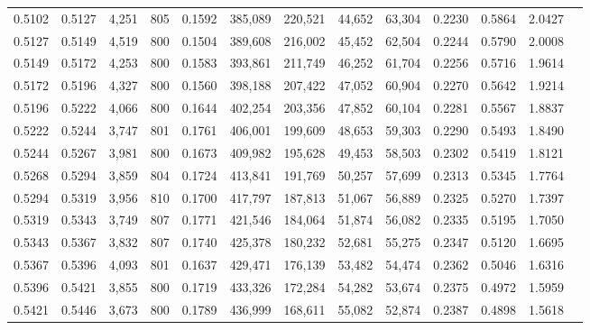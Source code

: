 \begin{tabular}{rrrrrrrrrrrrr}
0.5102 & 0.5127 &  4,251 & 805 &                                     0.1592 & 385,089 & 220,521 &  44,652 &  63,304 & 0.2230 & 0.5864 & 2.0427 \\
0.5127 & 0.5149 &  4,519 & 800 &                                     0.1504 & 389,608 & 216,002 &  45,452 &  62,504 & 0.2244 & 0.5790 & 2.0008 \\
0.5149 & 0.5172 &  4,253 & 800 &                                     0.1583 & 393,861 & 211,749 &  46,252 &  61,704 & 0.2256 & 0.5716 & 1.9614 \\
0.5172 & 0.5196 &  4,327 & 800 &                                     0.1560 & 398,188 & 207,422 &  47,052 &  60,904 & 0.2270 & 0.5642 & 1.9214 \\
0.5196 & 0.5222 &  4,066 & 800 &                                     0.1644 & 402,254 & 203,356 &  47,852 &  60,104 & 0.2281 & 0.5567 & 1.8837 \\
0.5222 & 0.5244 &  3,747 & 801 &                                     0.1761 & 406,001 & 199,609 &  48,653 &  59,303 & 0.2290 & 0.5493 & 1.8490 \\
0.5244 & 0.5267 &  3,981 & 800 &                                     0.1673 & 409,982 & 195,628 &  49,453 &  58,503 & 0.2302 & 0.5419 & 1.8121 \\
0.5268 & 0.5294 &  3,859 & 804 &                                     0.1724 & 413,841 & 191,769 &  50,257 &  57,699 & 0.2313 & 0.5345 & 1.7764 \\
0.5294 & 0.5319 &  3,956 & 810 &                                     0.1700 & 417,797 & 187,813 &  51,067 &  56,889 & 0.2325 & 0.5270 & 1.7397 \\
0.5319 & 0.5343 &  3,749 & 807 &                                     0.1771 & 421,546 & 184,064 &  51,874 &  56,082 & 0.2335 & 0.5195 & 1.7050 \\
0.5343 & 0.5367 &  3,832 & 807 &                                     0.1740 & 425,378 & 180,232 &  52,681 &  55,275 & 0.2347 & 0.5120 & 1.6695 \\
0.5367 & 0.5396 &  4,093 & 801 &                                     0.1637 & 429,471 & 176,139 &  53,482 &  54,474 & 0.2362 & 0.5046 & 1.6316 \\
0.5396 & 0.5421 &  3,855 & 800 &                                     0.1719 & 433,326 & 172,284 &  54,282 &  53,674 & 0.2375 & 0.4972 & 1.5959 \\
0.5421 & 0.5446 &  3,673 & 800 &                                     0.1789 & 436,999 & 168,611 &  55,082 &  52,874 & 0.2387 & 0.4898 & 1.5618 \\

\end{tabular}
